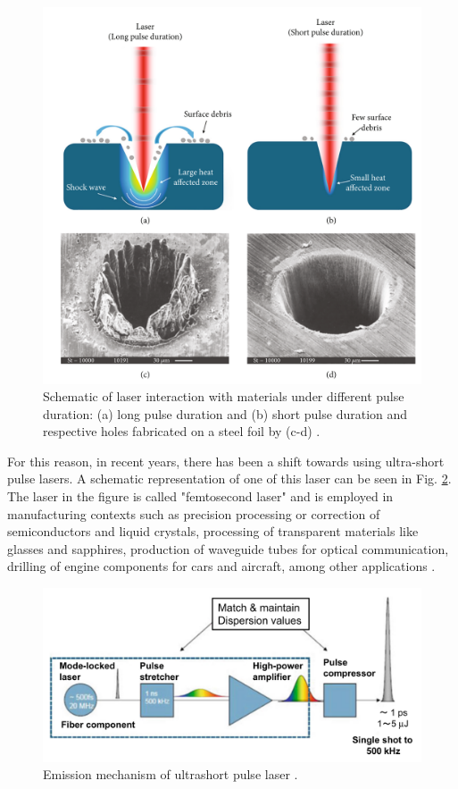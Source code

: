 \begin{figure}
    \centering
    \includegraphics[scale=0.35]{Images/laserpulsing.png}
    \caption[Material absorptivity as function of wavelength.]{Schematic of laser interaction with materials under different pulse duration: (a) long pulse duration and (b) short pulse duration and respective holes fabricated on a steel foil by (c-d) \cite{lin_femtosecond_2021}.}
    \label{fig:pulsipulsiocomepulsi}
\end{figure}
For this reason, in recent years, there has been a shift towards using ultra-short pulse lasers. A schematic representation of one of this laser can be seen in Fig. \ref{fig:duripoco}. The laser in the figure is called "femtosecond laser" and is employed in manufacturing contexts such as precision processing or correction of semiconductors and liquid crystals, processing of transparent materials like glasses and sapphires, production of waveguide tubes for optical communication, drilling of engine components for cars and aircraft, among other applications \cite{katayama_fundamentals_2020}.
\begin{figure}
    \centering
    \includegraphics[scale=0.4]{Images/duripoco.png}
    \caption[Ultrashort pulse laser.]{Emission mechanism of ultrashort pulse laser \cite{katayama_fundamentals_2020}.}
    \label{fig:duripoco}
\end{figure}
